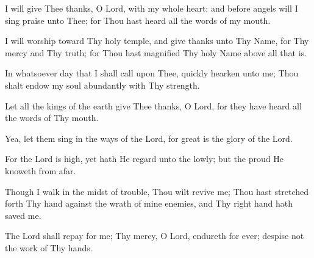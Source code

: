 I will give Thee thanks, O Lord, with my whole heart: and before angels will I sing praise unto Thee; for Thou hast heard all the words of my mouth.

I will worship toward Thy holy temple, and give thanks unto Thy Name, for Thy mercy and Thy truth; for Thou hast magnified Thy holy Name above all that is.

In whatsoever day that I shall call upon Thee, quickly hearken unto me; Thou shalt endow my soul abundantly with Thy strength.

Let all the kings of the earth give Thee thanks, O Lord, for they have heard all the words of Thy mouth.

Yea, let them sing in the ways of the Lord, for great is the glory of the Lord.

For the Lord is high, yet hath He regard unto the lowly; but the proud He knoweth from afar.

Though I walk in the midst of trouble, Thou wilt revive me; Thou hast stretched forth Thy hand against the wrath of mine enemies, and Thy right hand hath saved me.

The Lord shall repay for me; Thy mercy, O Lord, endureth for ever; despise not the work of Thy hands.

